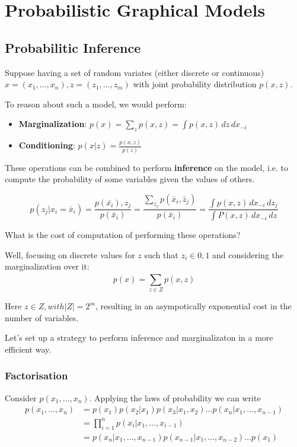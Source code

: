 
\chapter{Probabilistic Graphical Models}

\section{Probabilitic Inference}

Suppose having a set of random variates (either discrete or continuous) $x = (x_1,\dots, x_n), z = (z_1,\dots, z_m)$ with joint probability distribution $p(x,z)$.

To reason about such a model, we would perform:
\begin{itemize}
    \item \textbf{Marginalization}: $p(x) = \sum_z p(x,z) = \int p(x,z)\,dz\,dx_{-i}$
    \item \textbf{Conditioning}: $p(x|z) = \frac{p(x,z)}{p(z)}$
\end{itemize}

These operations can be combined to perform \textbf{inference} on the model, i.e. to compute the probability of some variables given the values of others.

\[
    p(z_j|x_i = \bar{x}_i) = \frac{p(\bar{x_i}), z_j}{p(\bar{x}_i)} = \frac{\sum_{\bar{z}_j} p(\bar{x}_i, \bar{z}_j)}{p(\bar{x}_i)} = \frac{\int p(x,z)\,dx_{-i}\,dz_{j}}{\int P(x,z)\,dx_{-i}\,dz}
\]

What is the cost of computation of performing these operations?

Well, focusing on discrete values for $z$ such that $z_i \in {0,1}$ and considering the marginalization over it:
\[
    p(x) = \sum_{z \in Z}^{}p(x,z)
\]

Here $z \in Z, with |Z| = 2^m$, resulting in an asympotically exponential cost in the number of variables.

Let's set up a strategy to perform inference and marginalizaton in a more efficient way. 

\subsection*{Factorisation}

Consider $p(x_1,\dots, x_n)$. Applying the laws of probability we can write
\[
\begin{array}{rl}
    p(x_1,\dots, x_n) &= p(x_1)p(x_2|x_1)p(x_3|x_1,x_2)\dots p(x_n|x_1,\dots, x_{n-1}) \\
    &= \prod_{i=1}^{n} p(x_i|x_1,\dots, x_{i-1}) \\
    &= p(x_n|x_1,\dots, x_{n-1})p(x_{n-1}|x_1,\dots, x_{n-2})\dots p(x_1)
\end{array}
\]

